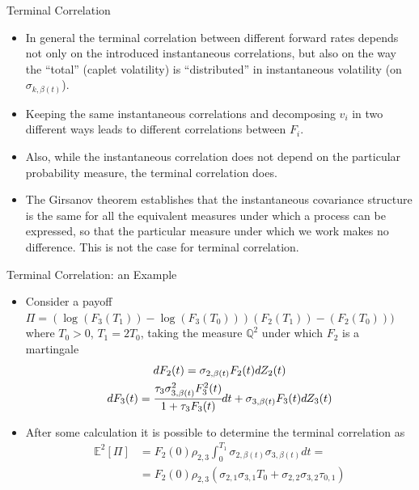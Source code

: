\documentclass{beamer}
\begin{document}
\begin{frame}{Terminal Correlation}
\begin{itemize}
\item In general the terminal correlation between different forward rates depends not only on the introduced instantaneous correlations, but also on the way the “total” (caplet volatility) is “distributed” in instantaneous volatility (on $\sigma_{k,\beta(t)}$).
\item Keeping the same instantaneous correlations and decomposing $v_i$ in two different ways leads to different correlations between $F_i$. 
\item Also, while the instantaneous correlation does not depend on the particular probability measure, the terminal correlation does. 
\item The Girsanov theorem establishes that the instantaneous covariance structure is the same for all the equivalent measures under which a process can be expressed, so that the particular measure under which we work makes no difference. This is not the case for terminal correlation. 
\end{itemize}
\end{frame}

\begin{frame}{Terminal Correlation: an Example}
\begin{itemize}
\item Consider a payoff $\Pi = (\log(F_3(T_1))-\log(F_3(T_0)))(F_2(T_1))-(F_2(T_0)))$ where $T_0>0$, $T_1=2T_0$, taking the measure $\mathbb{Q}^2$ under which $F_2$ is a martingale
\begin{equation*}
\begin{gathered}
dF_2(t) = \sigma_{2,\beta(t)}F_2(t)dZ_2(t)\\
dF_3(t) = \cfrac{\tau_3\sigma^2_{3,\beta(t)}F_3^2(t)}{1+\tau_3F_3(t)}dt + \sigma_{3,\beta(t)}F_3(t)dZ_3(t)
\end{gathered}
\end{equation*}
\item After some calculation it is possible to determine the terminal correlation as
\begin{equation}
\begin{aligned}
\mathbb{E}^2[\Pi] & = F_2(0)\rho_{2,3}\int_0^{T_1}\sigma_{2,\beta(t)}\sigma_{3,\beta(t)}dt = \\
&  = F_2(0)\rho_{2,3}(\sigma_{2,1}\sigma_{3,1}T_0+\sigma_{2,2}\sigma_{3,2}\tau_{0,1})
\end{aligned}
\label{eq:terminal_correlation_ex}
\end{equation}
\end{itemize}
\end{frame}
\end{document}
